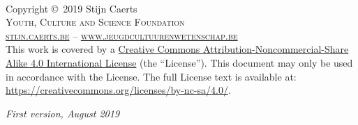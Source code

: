 \documentclass[11pt,fleqn]{book} %
\begin{document}

\begingroup
\thispagestyle{empty} %
\vfill
\endgroup


\newpage
~\vfill
\thispagestyle{empty}
{
\selectfont

\noindent Copyright \copyright\ 2019 Stijn Caerts\\ %

\noindent \textsc{Youth, Culture and Science Foundation}\\ %

\noindent \textsc{\href{https://stijn.caerts.be/}{stijn.caerts.be}} -- \textsc{\href{https://www.jeugdcultuurenwetenschap.be/}{www.jeugdcultuurenwetenschap.be}}\\ %

\noindent This work is covered by a \href{https://creativecommons.org/licenses/by-nc-sa/4.0/deed.nl}{Creative Commons Attribution-Noncommercial-Share Alike 4.0 International License} (the ``License''). This document may only be used in accordance with the License. The full License text is available at:\\
\url{https://creativecommons.org/licenses/by-nc-sa/4.0/}.\\

\noindent \href{https://creativecommons.org/licenses/by-nc-sa/4.0/}{\ccbyncsaeu}

\vspace{1cm}

\noindent \textit{First version, August 2019} %
}
\end{document}
